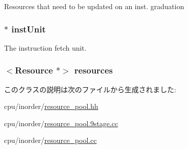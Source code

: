 \label{classResourcePool_a62c7474a6f50366616afac7a3af89f08}
Resources that need to be updated on an inst. graduation \hypertarget{classResourcePool_a693ed6c316127146b1da381cddea5ef9}{
\subsubsection[{instUnit}]{$\ast$ {\bf instUnit}}}
\label{classResourcePool_a693ed6c316127146b1da381cddea5ef9}
The instruction fetch unit. \hypertarget{classResourcePool_a46a3c49c7a2cc60b053ccc0fecdfc334}{
\subsubsection[{resources}]{$<${\bf Resource} $\ast$$>$ {\bf resources}}}
\label{classResourcePool_a46a3c49c7a2cc60b053ccc0fecdfc334}


このクラスの説明は次のファイルから生成されました:\begin{DoxyCompactItemize}
\item 
cpu/inorder/\hyperlink{resource__pool_8hh}{resource\_\-pool.hh}\item 
cpu/inorder/\hyperlink{resource__pool_89stage_8cc}{resource\_\-pool.9stage.cc}\item 
cpu/inorder/\hyperlink{resource__pool_8cc}{resource\_\-pool.cc}\end{DoxyCompactItemize}
